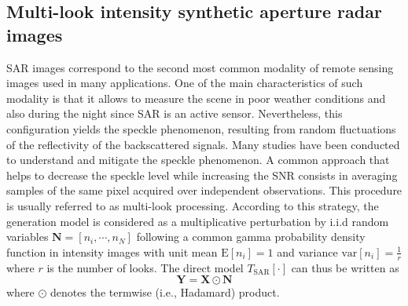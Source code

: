 \documentclass[review]{elsarticle}
\begin{document}
\begin{appendix}
\subsection{Multi-look intensity synthetic aperture radar images}

SAR images correspond to the second most common modality of remote sensing images used in many applications. One of the main characteristics of such modality is that it allows to measure the scene in poor weather conditions and also during the night since SAR is an active sensor. Nevertheless, this configuration yields the speckle phenomenon, resulting from random fluctuations of the reflectivity of the backscattered signals. Many studies have been conducted to understand and mitigate the speckle phenomenon. A common approach that helps to decrease the speckle level while increasing the SNR consists in averaging samples of the same pixel acquired over independent observations. This procedure is usually referred to as multi-look processing. According to this strategy, the generation model is considered as a multiplicative perturbation by i.i.d random variables $\mathbf{N} = [n_i,\cdots,n_{N}]$ following a common gamma probability density function in intensity images with unit mean $\mathrm{E}[n_i] = 1$ and variance $\mathrm{var}[n_i] = \frac{1}{r}$ where $r$ is the number of looks. The direct model $\mathit{T}_{\mathrm{SAR}}[\cdot]$ can thus be written as
%
\begin{equation}
	\mathbf{Y} = \mathbf{X} \odot \mathbf{N}
\end{equation}
where $\odot$ denotes the termwise (i.e., Hadamard) product.


\end{appendix}
\end{document}
